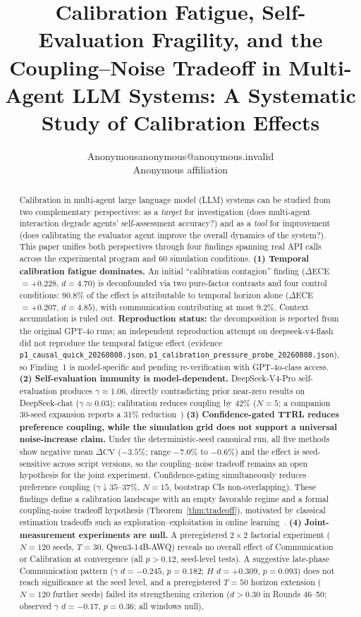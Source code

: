 \documentclass[11pt]{article}
\title{Calibration Fatigue, Self-Evaluation Fragility, and the Coupling--Noise Tradeoff in Multi-Agent LLM Systems: A Systematic Study of Calibration Effects}
\author{\name Anonymous\email anonymous@anonymous.invalid\\\addr Anonymous affiliation}
\date{}
\newcommand{\CV}{\ensuremath{\mathrm{CV}}}
\theoremstyle{definition}
\theoremstyle{remark}
\begin{document}
\maketitle

\begin{abstract}
Calibration in multi-agent large language model (LLM) systems can be studied from two complementary perspectives: as a \textit{target} for investigation (does multi-agent interaction degrade agents' self-assessment accuracy?) and as a \textit{tool} for improvement (does calibrating the evaluator agent improve the overall dynamics of the system?). This paper unifies both perspectives through four findings spanning real API calls across the experimental program and 60 simulation conditions. \textbf{(1) Temporal calibration fatigue dominates.} An initial ``calibration contagion'' finding ($\Delta$ECE $= +0.228$, $d = 4.70$) is deconfounded via two pure-factor contrasts and four control conditions: 90.8\% of the effect is attributable to temporal horizon alone ($\Delta$ECE $= +0.207$, $d = 4.85$), with communication contributing at most 9.2\%. Context accumulation is ruled out. \textbf{Reproduction status:} the decomposition is reported from the original GPT-4o runs; an independent reproduction attempt on deepseek-v4-flash did not reproduce the temporal fatigue effect (evidence \texttt{p1\_causal\_quick\_20260808.json}, \texttt{p1\_calibration\_pressure\_probe\_20260808.json}), so Finding~1 is model-specific and pending re-verification with GPT-4o-class access. \textbf{(2) Self-evaluation immunity is model-dependent.} DeepSeek-V4-Pro self-evaluation produces $\gamma \approx 1.06$, directly contradicting prior near-zero results on DeepSeek-chat ($\gamma \approx 0.03$); calibration reduces coupling by 42\% ($N{=}5$; a companion 30-seed expansion reports a 31\% reduction~\citep{companion2026}) \textbf{(3) Confidence-gated TTRL reduces preference coupling, while the simulation grid does not support a universal noise-increase claim.} Under the deterministic-seed canonical run, all five methods show negative mean $\Delta\CV$ ($-3.5\%$; range $-7.0\%$ to $-0.6\%$) and the effect is seed-sensitive across script versions, so the coupling--noise tradeoff remains an open hypothesis for the joint experiment. Confidence-gating simultaneously reduces preference coupling ($\gamma \downarrow 35$--$37\%$, $N{=}15$, bootstrap CIs non-overlapping). These findings define a calibration landscape with an empty favorable regime and a formal coupling-noise tradeoff hypothesis (Theorem~\ref{thm:tradeoff}), motivated by classical estimation tradeoffs such as exploration--exploitation in online learning~\citep{bubeck2012regret}. \textbf{(4) Joint-measurement experiments are null.} A preregistered $2 \times 2$ factorial experiment ($N{=}120$ seeds, $T{=}30$, Qwen3-14B-AWQ) reveals no overall effect of Communication or Calibration at convergence (all $p > 0.12$, seed-level tests). A suggestive late-phase Communication pattern ($\gamma$ $d{=}-0.245$, $p{=}0.182$; $H$ $d{=}+0.309$, $p{=}0.093$) does not reach significance at the seed level, and a preregistered $T{=}50$ horizon extension ($N{=}120$ further seeds) failed its strengthening criterion ($d > 0.30$ in Rounds 46--50; observed $\gamma$ $d{=}-0.17$, $p{=}0.36$; all windows null), 
\end{abstract}
\end{document}
